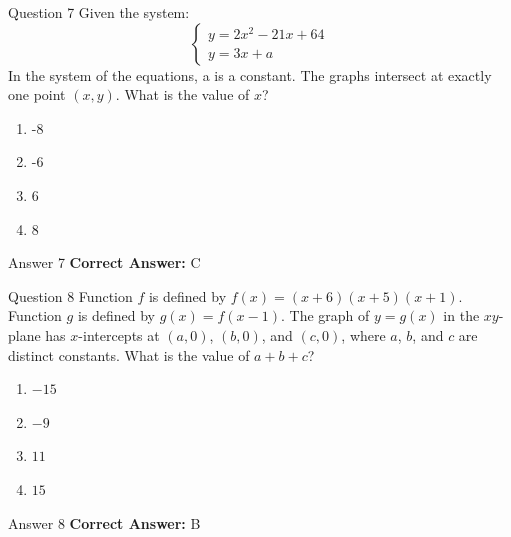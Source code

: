 \documentclass{beamer}
\begin{document}
\begin{frame}{Question 7}
\small
Given the system:  
\[
\begin{cases}
y = 2x^2 - 21x + 64 \\
y = 3x + a
\end{cases}
\]  
In the system of the equations, a is a constant. The graphs intersect at exactly one point \((x, y)\). What is the value of \(x\)?
\vspace{0.35cm}
\begin{enumerate}
    \item[A.] -8
    \item[B.] -6
    \item[C.] 6
    \item[D.] 8
\end{enumerate}
\end{frame}
\begin{frame}{Answer 7}
\small
\textbf{Correct Answer:} C
\end{frame}

\begin{frame}{Question 8}
\small
Function $f$ is defined by $f(x) = (x + 6)(x + 5)(x + 1)$.  
Function $g$ is defined by $g(x) = f(x - 1)$.  
The graph of $y = g(x)$ in the $xy$-plane has $x$-intercepts at $(a, 0)$, $(b, 0)$, and $(c, 0)$, where $a$, $b$, and $c$ are distinct constants.  
What is the value of $a + b + c$?
\vspace{0.35cm}
\begin{enumerate}
    \item[A.] $-15$
    \item[B.] $-9$
    \item[C.] $11$
    \item[D.] $15$
\end{enumerate}
\end{frame}
\begin{frame}{Answer 8}
\small
\textbf{Correct Answer:} B
\end{frame}
\end{document}
